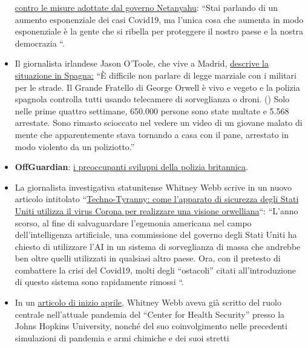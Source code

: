 \begin{itemize}
  \href{https://edition.cnn.com/2020/04/20/middleeast/israel-protest-social-distancing-intl/index.html}{contro
  le misure adottate dal governo Netanyahu}: ``Stai parlando di un
  aumento esponenziale dei casi Covid19, ma l'unica cosa che aumenta in
  modo esponenziale è la gente che si ribella per proteggere il nostro
  paese e la nostra democrazia ``.
\item
  Il giornalista irlandese Jason O'Toole, che vive a Madrid,
  \href{https://www.rt.com/op-ed/486350-spain-tough-rules-covid-19-lockdown/}{descrive
  la situazione in Spagna:} ``È difficile non parlare di legge marziale
  con i militari per le strade. Il Grande Fratello di George Orwell è
  vivo e vegeto e la polizia spagnola controlla tutti usando telecamere
  di sorveglianza o droni. () Solo nelle prime quattro settimane,
  650.000 persone sono state multate e 5.568 arrestate. Sono rimasto
  scioccato nel vedere un video di un giovane malato di mente che
  apparentemente stava tornando a casa con il pane, arrestato in modo
  violento da un poliziotto.''
\item
  \textbf{OffGuardian}:
  \href{https://off-guardian.org/2020/04/18/the-disturbing-developments-in-uk-policing/}{i
  preoccupanti sviluppi della polizia britannica}.
\item
  La giornalista investigativa statunitense Whitney Webb scrive in un
  nuovo articolo intitolato
  ``\href{http://unlimitedhangout.com/2020/05/reports/techno-tyranny-how-the-us-national-security-state-is-using-coronavirus-to-fulfill-an-orwellian-vision/}{Techno-Tyranny:
  come l'apparato di sicurezza degli Stati Uniti utilizza il virus
  Corona per realizzare una visione orwelliana}``: ``L'anno scorso, al
  fine di salvaguardare l'egemonia americana nel campo dell'intelligenza
  artificiale, una commissione del governo degli Stati Uniti ha chiesto
  di utilizzare l'AI in un sistema di sorveglianza di massa che andrebbe
  ben oltre quelli utilizzati in qualsiasi altro paese. Ora, con il
  pretesto di combattere la crisi del Covid19, molti degli ``ostacoli''
  citati all'introduzione di questo sistema sono rapidamente rimossi ``.
\item
  In un
  \href{http://unlimitedhangout.com/2020/04/investigative-series/all-roads-lead-to-dark-winter/}{articolo
  di inizio aprile}, Whitney Webb aveva già scritto del ruolo centrale
  nell'attuale pandemia del ``Center for Health Security'' presso la
  Johns Hopkins University, nonché del suo coinvolgimento nelle
  precedenti simulazioni di pandemia e armi chimiche e dei suoi stretti

\end{itemize}
